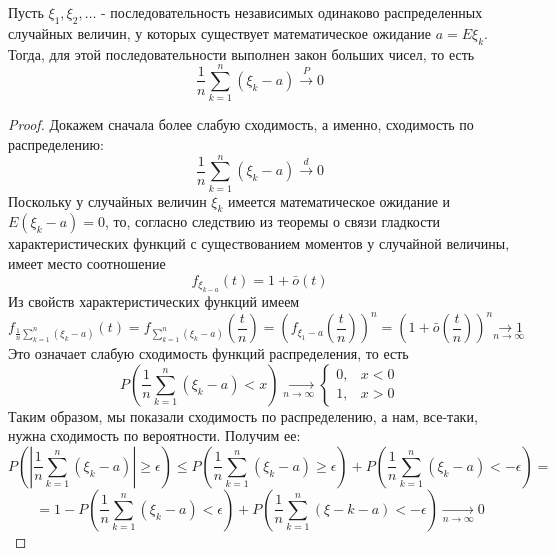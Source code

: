 \begin{theorem}
	Пусть $\xi_1, \xi_2, \dots$ - последовательность независимых одинаково распределенных случайных величин, у которых существует математическое ожидание $a = E \xi_k$. Тогда, для этой последовательности выполнен закон больших чисел, то есть
	\[ \frac{1}{n} \sum\limits_{k = 1}^{n} (\xi_k - a) \overset{P}{\to} 0 \]
	\begin{proof}
		Докажем сначала более слабую сходимость, а именно, сходимость по распределению:
		\[ \frac{1}{n} \sum\limits_{k = 1}^{n} (\xi_k - a) \overset{d}{\to} 0 \]
		Поскольку у случайных величин $\xi_k$ имеется математическое ожидание и $E (\xi_k - a) = 0$, то, согласно следствию из теоремы о связи гладкости характеристических функций с существованием моментов у случайной величины, имеет место соотношение
		\[ f_{\xi_{k-a}} (t) = 1 + \bar{o} (t) \]
		Из свойств характеристических функций имеем
		\[ f_{\frac{1}{n} \sum\limits_{k=1}^{n} (\xi_k - a)} (t) = f_{\sum\limits_{k=1}^{n}(\xi_k - a)} \left( \frac{t}{n} \right) = \left( f_{\xi_1 - a} \left( \frac{t}{n} \right) \right)^{n} = \left( 1 + \bar{o} \left( \frac{t}{n} \right) \right)^{n} \underset{n \to \infty}{\to 1} \]
		Это означает слабую сходимость функций распределения, то есть
		\[ P \left( \frac{1}{n} \sum_{k=1}^{n} (\xi_k - a) < x \right) \underset{n \to \infty}{\to} \begin{cases} 0, & x < 0 \\ 1, & x > 0 \end{cases} \]
		Таким образом, мы показали сходимость по распределению, а нам, все-таки, нужна сходимость по вероятности. Получим ее:
		\[ P \left( \left| \frac{1}{n} \sum_{k=1}^{n} ( \xi_k - a ) \right| \ge \epsilon \right) \le P \left( \frac{1}{n} \sum_{k=1}^{n} ( \xi_k - a ) \ge \epsilon \right) + P \left( \frac{1}{n} \sum_{k=1}^{n} ( \xi_k - a ) < - \epsilon \right) = \]
		\[ = 1 - P \left( \frac{1}{n} \sum_{k=1}^{n} ( \xi_k - a ) < \epsilon \right) + P \left( \frac{1}{n} \sum_{k=1}^{n} ( \xi-k - a ) < - \epsilon \right) \underset{n \to \infty}{\to} 0 \]
	\end{proof}
\end{theorem}

